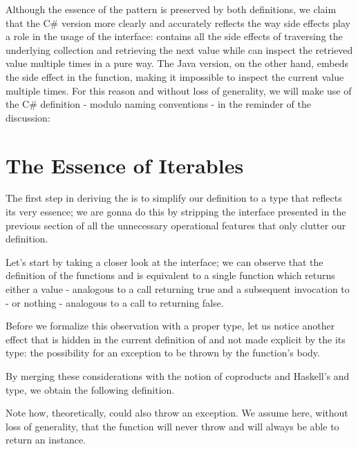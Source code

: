 
Although the essence of the pattern is preserved by both definitions, we claim that the C\# version more clearly and accurately reflects the way side effects play a role in the usage of the interface:  contains all the side effects of traversing the underlying collection and retrieving the next value while  can inspect the retrieved value multiple times in a pure way. The Java version, on the other hand, embeds the side effect in the  function, making it impossible to inspect the current value multiple times. For this reason and without loss of generality, we will make use of the C\# definition - modulo naming conventions - in the reminder of the discussion:


\section{The Essence of Iterables}

The first step in deriving the  is to simplify our  definition to a type that reflects its very essence; we are gonna do this by stripping the interface presented in the previous section of all the unnecessary operational features that only clutter our definition.

Let's start by taking a closer look at the  interface; we can observe that the definition of the functions  and  is equivalent to a single function which returns either a value - analogous to a  call returning true and a subsequent invocation to  - or nothing - analogous to a call to  returning false. 

Before we formalize this observation with a proper type, let us notice another effect that is hidden in the current definition of  and not made explicit by the its type: the possibility for an exception to be thrown by the function's body. 

By merging these considerations with the notion of coproducts and Haskell's  and  type, we obtain the following definition.


Note how, theoretically,  could also throw an exception. We assume here, without loss of generality, that the function will never throw and will always be able to return an  instance.

